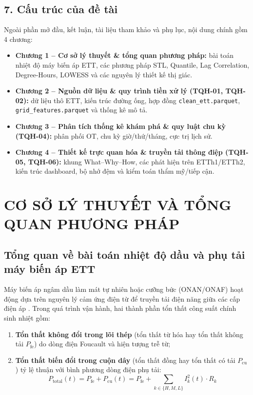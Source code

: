 \documentclass[12pt,a4paper,oneside]{report}
\newcommand{\code}[1]{\texttt{#1}}
\begin{document}
\section*{7. Cấu trúc của đề tài}

Ngoài phần mở đầu, kết luận, tài liệu tham khảo và phụ lục, nội dung chính gồm 4 chương:
\begin{itemize}
  \item \textbf{Chương 1 -- Cơ sở lý thuyết \& tổng quan phương pháp:} bài toán nhiệt độ máy biến áp ETT, các phương pháp STL, Quantile, Lag Correlation, Degree-Hours, LOWESS và các nguyên lý thiết kế thị giác.
  \item \textbf{Chương 2 -- Nguồn dữ liệu \& quy trình tiền xử lý (TQH-01, TQH-02):} dữ liệu thô ETT, kiến trúc đường ống, hợp đồng \code{clean\_ett.parquet}, \code{grid\_features.parquet} và thống kê mô tả.
  \item \textbf{Chương 3 -- Phân tích thống kê khám phá \& quy luật chu kỳ (TQH-04):} phân phối OT, chu kỳ giờ/thứ/tháng, cực trị lịch sử.
  \item \textbf{Chương 4 -- Thiết kế trực quan hóa \& truyền tải thông điệp (TQH-05, TQH-06):} khung What--Why--How, các phát hiện trên ETTh1/ETTh2, kiến trúc dashboard, bộ nhớ đệm và kiểm toán thẩm mỹ/tiếp cận.
\end{itemize}

\chapter{CƠ SỞ LÝ THUYẾT VÀ TỔNG QUAN PHƯƠNG PHÁP}

\section{Tổng quan về bài toán nhiệt độ dầu và phụ tải máy biến áp ETT}

Máy biến áp ngâm dầu làm mát tự nhiên hoặc cưỡng bức (ONAN/ONAF) hoạt động dựa trên nguyên lý cảm ứng điện từ để truyền tải điện năng giữa các cấp điện áp \cite{ieee2012}. Trong quá trình vận hành, hai thành phần tổn thất công suất chính sinh nhiệt gồm:
\begin{enumerate}
  \item \textbf{Tổn thất không đổi trong lõi thép} (tổn thất từ hóa hay tổn thất không tải $P_{\text{fe}}$) do dòng điện Foucault và hiện tượng trễ từ;
  \item \textbf{Tổn thất biến đổi trong cuộn dây} (tổn thất đồng hay tổn thất có tải $P_{\text{cu}}$) tỷ lệ thuận với bình phương dòng điện phụ tải:
  \begin{equation}
    P_{\text{total}}(t) = P_{\text{fe}} + P_{\text{cu}}(t) = P_{\text{fe}} + \sum_{k \in \{H, M, L\}} I_k^2(t) \cdot R_k
  \end{equation}
\end{enumerate}
\end{document}

